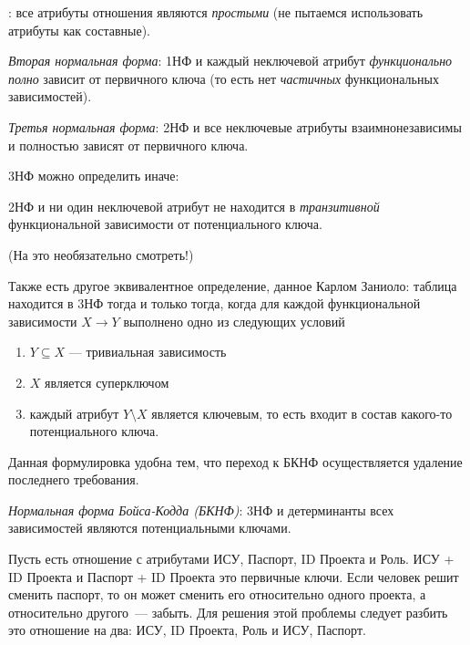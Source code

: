 \begin{definition}[1НФ]
  : все атрибуты отношения являются \textit{простыми} 
  (не пытаемся использовать атрибуты как составные).
\end{definition}

\begin{definition}[2НФ]
  \textit{Вторая нормальная форма}: 1НФ и каждый неключевой атрибут 
  \textit{функционально полно} зависит от первичного ключа
  (то есть нет \textit{частичных} функциональных зависимостей).
\end{definition}

\begin{definition}[3НФ]
  \textit{Третья нормальная форма}: 2НФ и все неключевые атрибуты взаимнонезависимы и
  полностью зависят от первичного ключа.
\end{definition}

3НФ можно определить иначе:
\begin{definition}[3НФ]
  2НФ и ни один неключевой атрибут не находится в \textit{транзитивной} функциональной
  зависимости от потенциального ключа.
\end{definition}

\begin{remark}
  (На это необязательно смотреть!)

  Также есть другое эквивалентное определение, данное Карлом Заниоло:
  таблица находится в 3НФ тогда и только тогда, когда для каждой функциональной зависимости
  \(X \to Y\) выполнено одно из следующих условий
  \begin{enumerate}
    \item \(Y \subseteq X\) --- тривиальная зависимость
    \item \(X\) является суперключом
    \item каждый атрибут \(Y \setminus X\) является ключевым,
    то есть входит в состав какого-то потенциального ключа.
  \end{enumerate}

  Данная формулировка удобна тем, что переход к БКНФ осуществляется удаление последнего требования.
\end{remark}

\begin{definition}[БКНФ]
  \textit{Нормальная форма Бойса-Кодда (БКНФ)}: 3НФ и детерминанты всех зависимостей
  являются потенциальными ключами.
\end{definition}

\begin{example}
  Пусть есть отношение с атрибутами ИСУ, Паспорт, ID Проекта и Роль. ИСУ +
   ID Проекта и Паспорт + ID Проекта это первичные ключи. Если человек решит
   сменить паспорт, то он может сменить его относительно одного проекта, а
   относительно другого~--- забыть. Для решения этой проблемы следует разбить
   это отношение на два: ИСУ, ID Проекта, Роль и ИСУ, Паспорт.
\end{example}

